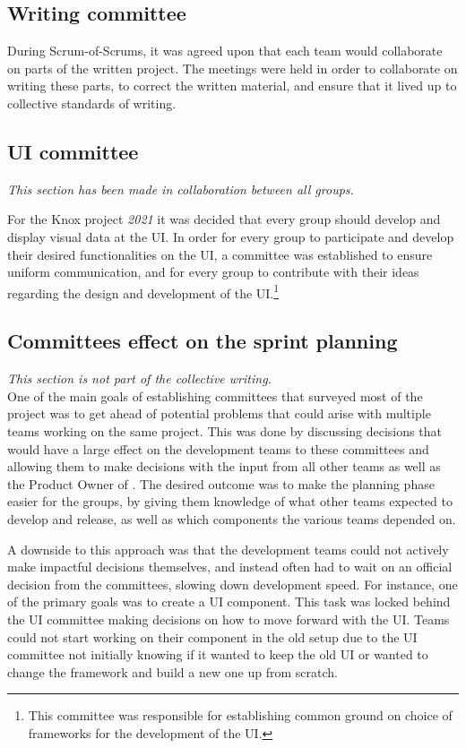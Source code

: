 \subsection{Writing committee}
During Scrum-of-Scrums, it was agreed upon that each team would collaborate on parts of the written project. The meetings were held in order to collaborate on writing these parts, to correct the written material, and ensure that it lived up to collective standards of writing.

\subsection{UI committee}
\textit{This section has been made in collaboration between all groups.}

For the Knox project \textit{2021} it was decided that every group should develop and display visual data at the UI.
In order for every group to participate and develop their desired functionalities on the UI, a committee was established to ensure uniform communication, and for every group to contribute with their ideas regarding the design and development of the UI.\footnote{This committee was responsible for establishing common ground on choice of frameworks for the development of the \knox{} UI.}

\subsection{Committees effect on the sprint planning}
\textit{This section is not part of the collective writing.}\\
One of the main goals of establishing committees that surveyed most of the \knox{} project was to get ahead of potential problems that could arise with multiple teams working on the same project. 
This was done by discussing decisions that would have a large effect on the development teams to these committees and allowing them to make decisions with the input from all other  \knox{} teams as well as the Product Owner of \knox{}. 
The desired outcome was to make the planning phase easier for the groups, by giving them knowledge of what other teams expected to develop and release, as well as which components the various teams depended on.

A downside to this approach was that the development teams could not actively make impactful decisions themselves, and instead often had to wait on an official decision from the committees, slowing down development speed. 
For instance, one of the primary goals was to create a UI component. 
This task was locked behind the UI committee making decisions on how to move forward with the UI. 
Teams could not start working on their component in the old setup due to the UI committee not initially knowing if it wanted to keep the old UI or wanted to change the framework and build a new one up from scratch.


